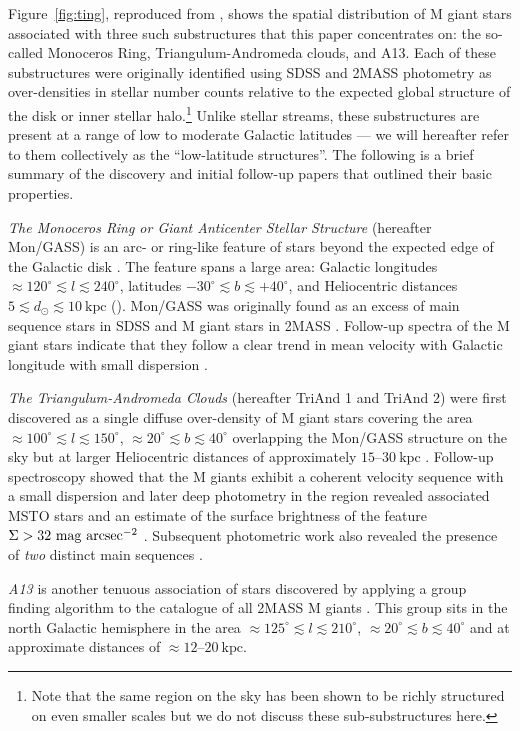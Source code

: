 \documentclass[galaxies,article,submit,moreauthors,pdftex,10pt,a4paper]{mdpi}
\newcommand{\kpc}{\mathrm{kpc}}
\begin{document}
Figure~\ref{fig:ting}, reproduced from \cite{li17}, shows the spatial distribution of M giant stars associated with three such substructures that this paper concentrates on: the so-called Monoceros Ring, Triangulum-Andromeda clouds, and A13.
Each of these substructures were originally identified using SDSS and 2MASS photometry as over-densities in stellar number counts relative to the expected global structure of the disk or inner stellar halo.\footnote{Note that the same region on the sky has been shown to be richly structured on even smaller scales\cite{slater14,martin14,deason14} but we do not discuss these sub-substructures here.}
Unlike stellar streams, these substructures are present at a range of low to moderate Galactic latitudes --- we will hereafter refer to them collectively as the ``low-latitude structures''.
The following is a brief  summary of the discovery and initial follow-up papers that outlined their basic properties.
\begin{description}
\item{\it The Monoceros Ring or Giant Anticenter Stellar Structure} (hereafter Mon/GASS) is an arc- or ring-like feature of stars beyond the expected edge of the Galactic disk \cite[assumed to be $\approx 5~\kpc$ beyond the Sun in cylindrical radius ---][]{robin92}.
The feature spans a large area: Galactic longitudes $\approx 120^\circ \lesssim l \lesssim 240^\circ$, latitudes $-30^\circ \lesssim b \lesssim +40^\circ$, and Heliocentric distances $5\lesssim d_\odot \lesssim 10~\kpc$ (\cite{Morganson:2016}).
Mon/GASS was originally found as an excess of main sequence stars in SDSS \cite{yanny03,ibata03} and M giant stars in 2MASS \cite{rochapinto03}.
Follow-up spectra of the M giant stars indicate that they follow a clear trend in mean velocity with Galactic longitude with small dispersion \cite{crane03}.
\item{\it The Triangulum-Andromeda Clouds} (hereafter TriAnd 1 and TriAnd 2) were first discovered as a single diffuse over-density of M giant stars covering the area $\approx 100^\circ \lesssim l \lesssim 150^\circ$, $\approx 20^\circ \lesssim b \lesssim 40^\circ$ overlapping the Mon/GASS structure on the sky but at larger Heliocentric distances of approximately $15$--$30~\kpc$ \cite{rochapinto04}.
Follow-up spectroscopy showed that the M giants exhibit a coherent velocity sequence with a small dispersion \cite{rochapinto04} and later deep photometry in the region revealed associated MSTO stars and an estimate of the surface brightness of the feature $\Sigma > 32~{\rm mag}~{\rm arcsec}^{-2}$ \cite{majewski04}.
Subsequent photometric work also revealed the presence of {\it two} distinct main sequences \cite{martin07}.
\item{\it A13} is another tenuous association of stars discovered by applying a group finding algorithm \cite{sharma09} to the catalogue of all 2MASS M giants \cite{sharma10}.
This group sits in the north Galactic hemisphere in the area $\approx 125^\circ \lesssim l \lesssim 210^\circ$, $\approx 20^\circ \lesssim b \lesssim 40^\circ$ and at approximate distances of $\approx 12$--$20~\kpc$.
\end{description}
\end{document}
